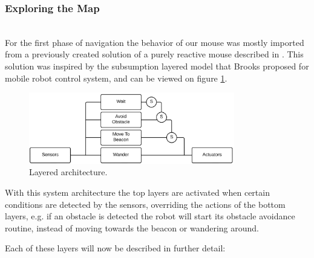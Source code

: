 \documentclass[oribibl]{llncs}
\begin{document}
\subsubsection{Exploring the Map}\hfill \\

For the first phase of navigation the behavior of our mouse was mostly imported from a previously created solution of a purely reactive mouse described in \cite{Moreira2012}. This solution was inspired by the subsumption layered model that Brooks proposed for mobile robot control system\cite{Brooks_1986}, and can be viewed on figure \ref{fig:layered}.

\begin{figure}
  \centering
  \includegraphics[width=0.8\textwidth]{layer-architecture.png}
  \caption{Layered architecture.}
  \label{fig:layered}
\end{figure}

With this system architecture the top layers are activated when certain conditions are detected by the sensors, overriding the actions of the bottom layers, e.g. if an obstacle is detected the robot will start its obstacle avoidance routine, instead of moving towards the beacon or wandering around. 

Each of these layers will now be described in further detail:
\end{document}
